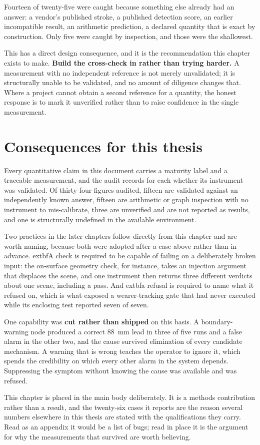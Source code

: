 Fourteen of twenty-five were caught because something else already had an
answer: a vendor's published stroke, a published detection score, an earlier
incompatible result, an arithmetic prediction, a declared quantity that is
exact by construction. Only five were caught by inspection, and those were the
shallowest.

This has a direct design consequence, and it is the recommendation this
chapter exists to make. \textbf{Build the cross-check in rather than trying
harder.} A measurement with no independent reference is not merely
unvalidated; it is structurally unable to be validated, and no amount of
diligence changes that. Where a project cannot obtain a second reference for a
quantity, the honest response is to mark it unverified rather than to raise
confidence in the single measurement.

\section{Consequences for this thesis}

Every quantitative claim in this document carries a maturity label and a
traceable measurement, and the audit records for each whether its instrument
was validated. Of thirty-four figures audited, fifteen are validated against an
independently known answer, fifteen are arithmetic or graph inspection with no
instrument to mis-calibrate, three are unverified and are not reported as
results, and one is structurally undefined in the available environment.

Two practices in the later chapters follow directly from this chapter and are
worth naming, because both were adopted after a case above rather than in
advance. 	extbf{A check is required to be capable of failing on a
deliberately broken input}: the on-surface geometry check, for instance, takes
an injection argument that displaces the scene, and one instrument then
returns three different verdicts about one scene, including a pass. And
	extbf{a refusal is required to name what it refused on}, which is what
exposed a wearer-tracking gate that had never executed while its enclosing
test reported seven of seven.

One capability was \textbf{cut rather than shipped} on this basis. A
boundary-warning node produced a correct \SI{88}{\milli\metre} lead in three of
five runs and a false alarm in the other two, and the cause survived
elimination of every candidate mechanism. A warning that is wrong teaches the
operator to ignore it, which spends the credibility on which every other alarm
in the system depends. Suppressing the symptom without knowing the cause was
available and was refused.

This chapter is placed in the main body deliberately. It is a methods
contribution rather than a result, and the twenty-six cases it reports are the
reason several numbers elsewhere in this thesis are stated with the
qualifications they carry. Read as an appendix it would be a list of bugs;
read in place it is the argument for why the measurements that survived are
worth believing.
